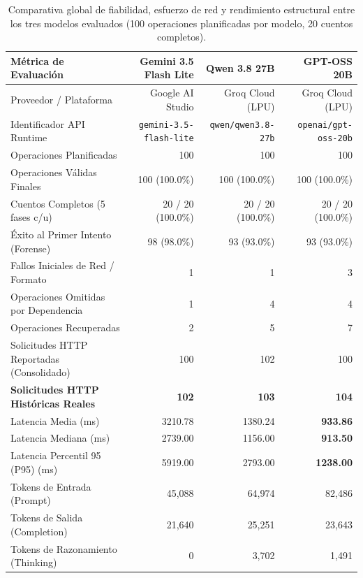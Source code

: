\documentclass{article}
\begin{document}
\begin{table}[t]
\centering
\caption{Comparativa global de fiabilidad, esfuerzo de red y rendimiento estructural entre los tres modelos evaluados (100 operaciones planificadas por modelo, 20 cuentos completos).}
\label{tab:comparativa_modelos_benchmark}
\begin{tabular}{lrrr}
\toprule
\textbf{Métrica de Evaluación} & \textbf{Gemini 3.5 Flash Lite} & \textbf{Qwen 3.8 27B} & \textbf{GPT-OSS 20B} \\
\midrule
Proveedor / Plataforma & Google AI Studio & Groq Cloud (LPU) & Groq Cloud (LPU) \\
Identificador API Runtime & \texttt{gemini-3.5-flash-lite} & \texttt{qwen/qwen3.8-27b} & \texttt{openai/gpt-oss-20b} \\
Operaciones Planificadas & 100 & 100 & 100 \\
Operaciones Válidas Finales & 100 (100.0\%) & 100 (100.0\%) & 100 (100.0\%) \\
Cuentos Completos (5 fases c/u) & 20 / 20 (100.0\%) & 20 / 20 (100.0\%) & 20 / 20 (100.0\%) \\
Éxito al Primer Intento (Forense) & 98 (98.0\%) & 93 (93.0\%) & 93 (93.0\%) \\
Fallos Iniciales de Red / Formato & 1 & 1 & 3 \\
Operaciones Omitidas por Dependencia & 1 & 4 & 4 \\
Operaciones Recuperadas & 2 & 5 & 7 \\
Solicitudes HTTP Reportadas (Consolidado) & 100 & 102 & 100 \\
\textbf{Solicitudes HTTP Históricas Reales} & \textbf{102} & \textbf{103} & \textbf{104} \\
\midrule
Latencia Media (ms) & 3210.78 & 1380.24 & \textbf{933.86} \\
Latencia Mediana (ms) & 2739.00 & 1156.00 & \textbf{913.50} \\
Latencia Percentil 95 (P95) (ms) & 5919.00 & 2793.00 & \textbf{1238.00} \\
\midrule
Tokens de Entrada (Prompt) & 45,088 & 64,974 & 82,486 \\
Tokens de Salida (Completion) & 21,640 & 25,251 & 23,643 \\
Tokens de Razonamiento (Thinking) & 0 & 3,702 & 1,491 \\

\end{tabular}
\end{table}
\end{document}
